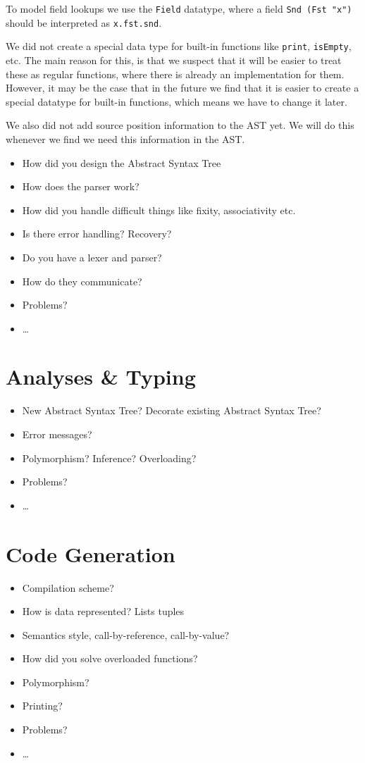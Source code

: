 \documentclass{report}
\begin{document}
To model field lookups we use the \texttt{Field} datatype,
where a field \texttt{Snd (Fst "x")} should be interpreted as \lstinline[language=SPL]|x.fst.snd|.

We did not create a special data type for built-in functions like \lstinline[language=SPL]|print|, \lstinline[language=SPL]|isEmpty|, etc.
The main reason for this, is that we suspect that it will be easier to treat these as regular functions,
where there is already an implementation for them.
However, it may be the case that in the future we find that it is easier to create a special datatype for built-in functions,
which means we have to change it later.

We also did not add source position information to the AST yet.
We will do this whenever we find we need this information in the AST.

\begin{itemize}
	\item How did you design the Abstract Syntax Tree
	\item How does the parser work?
	\item How did you handle difficult things like fixity, associativity etc.
	\item Is there error handling? Recovery?
	\item Do you have a lexer and parser?
	\item How do they communicate?
	\item Problems?
	\item\ldots
\end{itemize}

\chapter{Analyses \& Typing}
\begin{itemize}
	\item New Abstract Syntax Tree? Decorate existing Abstract Syntax Tree?
	\item Error messages?
	\item Polymorphism? Inference? Overloading?
	\item Problems?
	\item\ldots
\end{itemize}

\chapter{Code Generation}
\begin{itemize}
	\item Compilation scheme?
	\item How is data represented? Lists tuples
	\item Semantics style, call-by-reference, call-by-value?
	\item How did you solve overloaded functions?
	\item Polymorphism?
	\item Printing?
	\item Problems?
	\item\ldots
\end{itemize}
\end{document}
